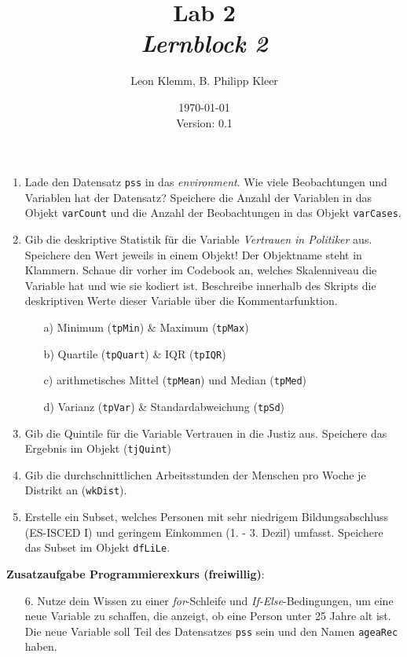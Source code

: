\documentclass[12pt,a4paper]{article}
\title{Lab 2 \\ \normalsize \textit{Lernblock 2}}
\author{Leon Klemm, B. Philipp Kleer}
\date{\today \\ \small{Version: 0.1}}
\begin{document}
\maketitle

	\begin{enumerate}
		\item Lade den Datensatz \texttt{pss} in das \textit{environment}. Wie viele Beobachtungen und Variablen hat der Datensatz? Speichere die Anzahl der Variablen in das Objekt \texttt{varCount} und die Anzahl der Beobachtungen in das Objekt \texttt{varCases}.
		\item Gib die deskriptive Statistik für die Variable \textit{Vertrauen in Politiker} aus. Speichere den Wert jeweils in einem Objekt! Der Objektname steht in Klammern. Schaue dir vorher im Codebook an, welches Skalenniveau die Variable hat und wie sie kodiert ist. Beschreibe innerhalb des Skripts die deskriptiven Werte dieser Variable über die Kommentarfunktion.
    	\begin{enumerate}
    		\item[a)] Minimum (\texttt{tpMin}) \& Maximum (\texttt{tpMax})
    		\item[b)] Quartile (\texttt{tpQuart}) \& IQR (\texttt{tpIQR})
    		\item[c)] arithmetisches Mittel (\texttt{tpMean}) und Median (\texttt{tpMed})
    		\item[d)] Varianz (\texttt{tpVar}) \& Standardabweichung (\texttt{tpSd})
    	\end{enumerate}
		\item Gib die Quintile für die Variable Vertrauen in die Justiz aus. Speichere das Ergebnis im Objekt (\texttt{tjQuint})
		\item Gib die durchschnittlichen Arbeitsstunden der Menschen pro Woche je Distrikt an (\texttt{wkDist}).
		\item Erstelle ein Subset, welches Personen mit sehr niedrigem Bildungsabschluss (ES-ISCED I) und geringem Einkommen (1. - 3. Dezil) umfasst. Speichere das Subset im Objekt \texttt{dfLiLe}.
\end{enumerate}

\textbf{Zusatzaufgabe Programmierexkurs (freiwillig)}:
\begin{enumerate}
	\item[6.] Nutze dein Wissen zu einer \textit{for}-Schleife und \textit{If-Else}-Bedingungen, um eine neue Variable zu schaffen, die anzeigt, ob eine Person unter 25 Jahre alt ist. Die neue Variable soll Teil des Datensatzes \texttt{pss} sein und den Namen \texttt{ageaRec} haben.
\end{enumerate}
\end{document}

